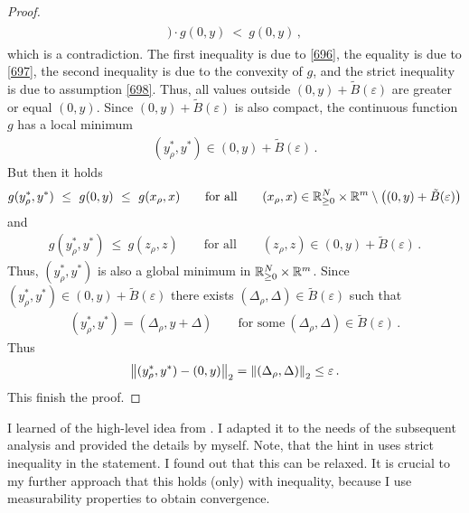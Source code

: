 \begin{proof}
\begin{align*}
\begin{split}
  )
  \cdot
  g
  (0,y)
  \ 
      <
  \ 
      g(0,y)
  \,    ,
      \end{split}
    \end{align*}
    which is a contradiction.
    The first inequality is due to \eqref{696}, the equality is due to \eqref{697}, the second inequality is due to the convexity of $g$,
    and the strict inequality is due to assumption \eqref{698}.
    Thus, all values outside 
    $(0,y)+\tilde{B}(\varepsilon)$
    are greater or equal $(0,y)$.
    Since 
    $(0,y)+\tilde{B}(\varepsilon)$
    is also compact, the continuous function $g$ has a local minimum
    \begin{gather*}
      (y^*_\rho,y^*)\in
    (0,y)+\tilde{B}(\varepsilon)
    \,.
    \end{gather*}
    But then it holds
    \begin{gather*}
      g
      (y^*_\rho,y^*)
      \ 
      \le
      \ 
      g(0,y)
      \ 
      \le
      \ 
      g
      (x_\rho,x)
      \qquad
      \text{for all}
      \qquad 
      (x_\rho,x)
      \in
\R^N_{\ge 0}\times\R^m\setminus 
\left(
  (0,y)
  +
    \tilde{B}(\varepsilon)
\right)
    \end{gather*}
    and
    \begin{gather*}
      g
      (y^*_\rho,y^*)
      \ 
      \le
      \ 
      g
      (z_\rho,z)
      \qquad
      \text{for all}
      \qquad 
      (z_\rho,z)
      \in
  (0,y)
  +
    \tilde{B}(\varepsilon)
    \,.
    \end{gather*}
    Thus,
    $
      (y^*_\rho,y^*)
    $
    is also a global minimum in
    $
\mathbb{R}^N_{\ge 0}\times\mathbb{R}^m
    $.
Since
    $
      (y^*_\rho,y^*)
      \in
  (0,y)
  +
    \tilde{B}(\varepsilon)
    $
    there exists
    $
    (\Delta_\rho,\Delta)\in
    \tilde{B}(\varepsilon)
    $
    such that 
    \begin{gather*}
      (y^*_\rho,y^*)
      =
      (\Delta_\rho,y+\Delta)
      \qquad
      \text{for some}\ 
      (\Delta_\rho,\Delta)
      \in
      \tilde{B}(\varepsilon)
      \,.
    \end{gather*}
  Thus
  \begin{gather*}
    \left\lVert
      (y^*_\rho,y^*)
      -
      (0,y)
    \right\rVert_2
    =
    \left\lVert
      (\Delta_\rho,\Delta)
    \right\rVert_2
    \le \varepsilon
    \,.
  \end{gather*}
  This finish the proof.
\end{proof}
\begin{remark}
  I learned of the high-level idea from \cite[page 22]{Wang2019}.
  I adapted it to the needs of the subsequent analysis and provided the details by myself.
  Note, that the hint in \cite[page 22]{Wang2019}
  uses strict inequality in the statement.
  I found out that this can be relaxed.
  It is crucial to my further approach that this holds (only) with inequality, because I use measurability properties to obtain convergence.
\end{remark}
